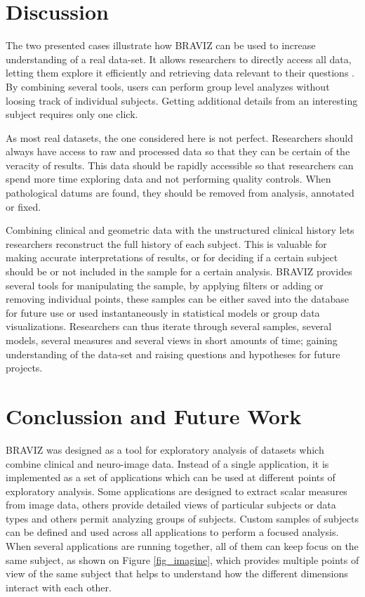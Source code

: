 \documentclass[twocolumn]{svjour3}
\begin{document}
\section{Discussion}
\label{sec:disc}

The two presented cases illustrate how BRAVIZ can be used to increase understanding of a real data-set. 
It allows researchers to directly access all data, letting them explore it efficiently and retrieving data relevant to their questions . By combining several tools, users can perform group level analyzes without loosing track of individual subjects. Getting additional details from an interesting subject requires only one click. 

As most real datasets, the one considered here is not perfect. Researchers should always have access to raw and processed data so that they can be certain of the veracity of results. This data should be rapidly accessible so that researchers can spend more time exploring data and not performing quality controls. When pathological datums are found, they should be removed from analysis, annotated or fixed. 

Combining clinical and geometric data with the unstructured clinical history lets researchers reconstruct the full history of each subject. This is valuable for making accurate interpretations of results, or for deciding if a certain subject should be or not included in the sample for a certain analysis. BRAVIZ provides several tools for manipulating the sample, by applying filters or adding or removing individual points, these samples can be either saved into the database for future use or used instantaneously in statistical models or group data visualizations. Researchers can thus iterate through several samples, several models, several measures and several views in short amounts of time; gaining understanding of the data-set and raising questions and hypotheses for future projects.

\section{Conclussion and Future Work}

BRAVIZ was designed as a tool for exploratory analysis of datasets which combine clinical and neuro-image data. Instead of a single application, it is implemented as a set of applications which can be used at different points of exploratory analysis. Some applications are designed to extract scalar measures from image data, others provide detailed views of particular subjects or data types and others permit analyzing groups of subjects. Custom samples of subjects can be defined and used across all applications to perform a focused analysis. When several applications are running together, all of them can keep focus on the same subject, as shown on Figure \ref{fig_imagine}, which provides multiple points of view of the same subject that helps to understand how the different dimensions interact with each other. 
\end{document}
